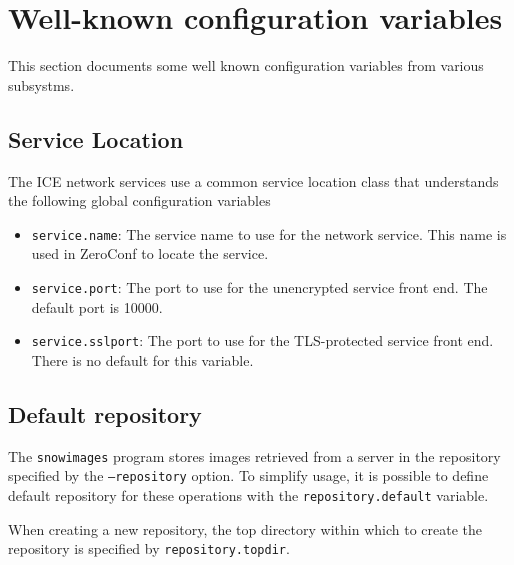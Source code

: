 \section{Well-known configuration variables}
This section documents some well known configuration variables from 
various subsystms.
\subsection{Service Location}
The ICE network services use a common service location class that
understands the following global configuration variables
\begin{itemize}
\item
\texttt{service.name}:
The service name to use for the network service.
This name is used in ZeroConf to locate the service.
\item
\texttt{service.port}:
The port to use for the unencrypted service front end.
The default port is 10000.
\item
\texttt{service.sslport}:
The port to use for the TLS-protected service front end.
There is no default for this variable.
\end{itemize}

\subsection{Default repository}
The \texttt{snowimages} program stores images retrieved from a server
in the repository specified by the \texttt{--repository} option.
To simplify usage, it is possible to define default repository
for these operations with the \texttt{repository.default} variable.

When creating a new repository, the top directory within which to create
the repository is specified by \texttt{repository.topdir}.


